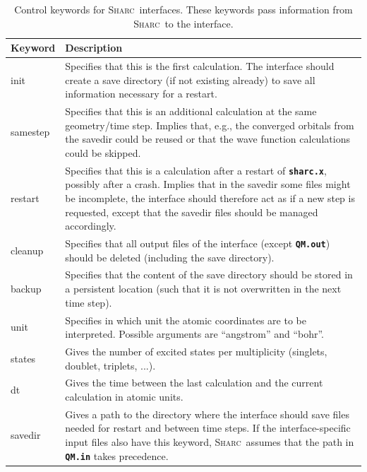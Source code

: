\documentclass[a4paper,10pt,DIV=15,openany]{scrbook}
\newcommand{\sharc}{\textsc{Sharc}}
\newcommand{\ttt}[1]{\textbf{\texttt{#1}}}
\begin{document}
\begin{table}
  \centering
  \caption[Control keywords for \sharc\ interfaces.]{Control keywords for \sharc\ interfaces. These keywords pass information from \sharc\ to the interface.}
  \label{tab:int_ctrl}
  \begin{tabular}{>{\ttfamily}lp{13cm}}
  \hline
  Keyword       &Description\\
  \hline
  init            &Specifies that this is the first calculation. The interface should create a save directory (if not existing already) to save all information necessary for a restart. \\
  samestep        &Specifies that this is an additional calculation at the same geometry/time step. Implies that, e.g., the converged orbitals from the savedir could be reused or that the wave function calculations could be skipped.\\
  restart         &Specifies that this is a calculation after a restart of \ttt{sharc.x}, possibly after a crash. Implies that in the savedir some files might be incomplete, the interface should therefore act as if a new step is requested, except that the savedir files should be managed accordingly.\\
  cleanup         &Specifies that all output files of the interface (except \ttt{QM.out}) should be deleted (including the save directory).\\
  backup          &Specifies that the content of the save directory should be stored in a persistent location (such that it is not overwritten in the next time step).\\
  unit            &Specifies in which unit the atomic coordinates are to be interpreted. Possible arguments are ``angstrom'' and ``bohr''.\\
  states          &Gives the number of excited states per multiplicity (singlets, doublet, triplets, ...).\\
  dt              &Gives the time between the last calculation and the current calculation in atomic units.\\
  savedir         &Gives a path to the directory where the interface should save files needed for restart and between time steps. If the interface-specific input files also have this keyword, \sharc\ assumes that the path in \ttt{QM.in} takes precedence.\\
  \hline
  \end{tabular}
\end{table}
\end{document}
